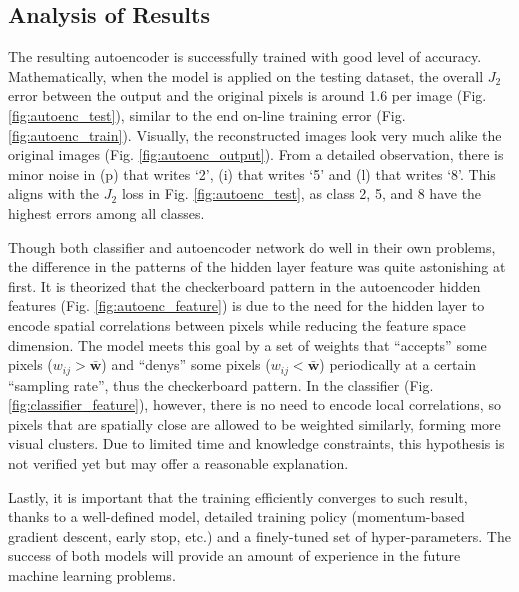 \documentclass[11pt,titlepage]{article}
\begin{document}
\subsection{Analysis of Results}

The resulting autoencoder is successfully trained with good level of accuracy. Mathematically, when the model is applied on the testing dataset, the overall $J_2$ error between the output and the original pixels is around 1.6 per image (Fig. \ref{fig:autoenc_test}), similar to the end on-line training error (Fig. \ref{fig:autoenc_train}). Visually, the reconstructed images look very much alike the original images (Fig. \ref{fig:autoenc_output}). From a detailed observation, there is minor noise in (p) that writes `2', (i) that writes `5' and (l) that writes `8'. This aligns with the $J_2$ loss in Fig. \ref{fig:autoenc_test}, as class 2, 5, and 8 have the highest errors among all classes. 

Though both classifier and autoencoder network do well in their own problems, the difference in the patterns of the hidden layer feature was quite astonishing at first. It is theorized that the checkerboard pattern in the autoencoder hidden features (Fig. \ref{fig:autoenc_feature}) is due to the need for the hidden layer to encode spatial correlations between pixels while reducing the feature space dimension. The model meets this goal by a set of weights that ``accepts'' some pixels ($w_{ij} > \boldsymbol{\bar{w}}$) and ``denys'' some pixels ($w_{ij} < \boldsymbol{\bar{w}}$) periodically at a certain ``sampling rate'', thus the checkerboard pattern. In the classifier (Fig. \ref{fig:classifier_feature}), however, there is no need to encode local correlations, so pixels that are spatially close are allowed to be weighted similarly, forming more visual clusters. Due to limited time and knowledge constraints, this hypothesis is not verified yet but may offer a reasonable explanation. 

Lastly, it is important that the training efficiently converges to such result, thanks to a well-defined model, detailed training policy (momentum-based gradient descent, early stop, etc.) and a finely-tuned set of hyper-parameters. The success of both models will provide an amount of experience in the future machine learning problems.

\vfill


\end{document}
